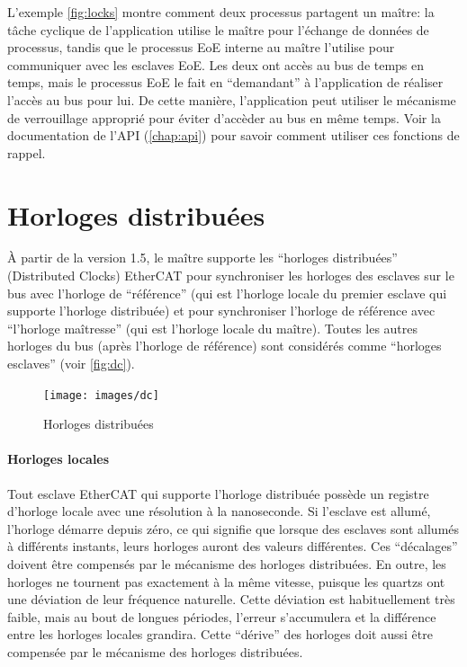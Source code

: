 \documentclass[a4paper,12pt,BCOR6mm,bibtotoc,idxtotoc]{scrbook}
\begin{document}
L'exemple \autoref{fig:locks} montre comment deux processus partagent
un ma\^itre: la t\^ache cyclique de l'application utilise le ma\^itre
pour l'\'echange de donn\'ees de processus, tandis que le processus
EoE interne au ma\^itre l'utilise pour communiquer avec les esclaves
EoE.  Les deux ont acc\`es au bus de temps en temps, mais le processus
EoE le fait en ``demandant'' \`a l'application de r\'ealiser l'acc\`es
au bus pour lui.  De cette mani\`ere, l'application peut utiliser le
m\'ecanisme de verrouillage appropri\'e pour \'eviter d'acc\`eder au
bus en m\^eme temps.  Voir la documentation de l'API
(\autoref{chap:api}) pour savoir comment utiliser ces fonctions de
rappel.


\section{Horloges distribu\'ees}
\label{sec:dc}

\`A partir de la version 1.5, le ma\^itre supporte les ``horloges distribu\'ees'' (Distributed Clocks) EtherCAT pour synchroniser les horloges des esclaves
sur le bus avec l'horloge de ``r\'ef\'erence''
(qui est l'horloge locale du premier esclave qui supporte l'horloge
distribu\'ee) et pour synchroniser l'horloge de r\'ef\'erence avec
``l'horloge ma\^itresse'' (qui est l'horloge locale du ma\^itre).
Toutes les autres horloges du bus (apr\`es l'horloge de r\'ef\'erence)
sont consid\'er\'es comme ``horloges esclaves'' (voir \autoref{fig:dc}).

\begin{figure}[htbp]
  \centering
  \texttt{[image: images/dc]}
  \caption{Horloges distribu\'ees}
  \label{fig:dc}
\end{figure}

\paragraph{Horloges locales} Tout esclave EtherCAT qui supporte
l'horloge distribu\'ee
poss\`ede un registre d'horloge locale avec une r\'esolution \`a la
nanoseconde.  Si l'esclave est allum\'e, l'horloge d\'emarre depuis
z\'ero, ce qui signifie que lorsque des esclaves sont allum\'es \`a
diff\'erents instants, leurs horloges auront des valeurs diff\'erentes.
Ces ``d\'ecalages'' doivent \^etre compens\'es par le m\'ecanisme des
horloges distribu\'ees.  En outre, les horloges ne tournent
pas exactement \`a la m\^eme vitesse, puisque les quartzs ont une
d\'eviation de leur fr\'equence naturelle.  Cette d\'eviation est
habituellement tr\`es faible, mais au bout de longues p\'eriodes,
l'erreur s'accumulera et la diff\'erence entre les horloges locales
grandira. Cette ``d\'erive'' des horloges doit aussi \^etre
compens\'ee par le m\'ecanisme des horloges distribu\'ees.
\end{document}
